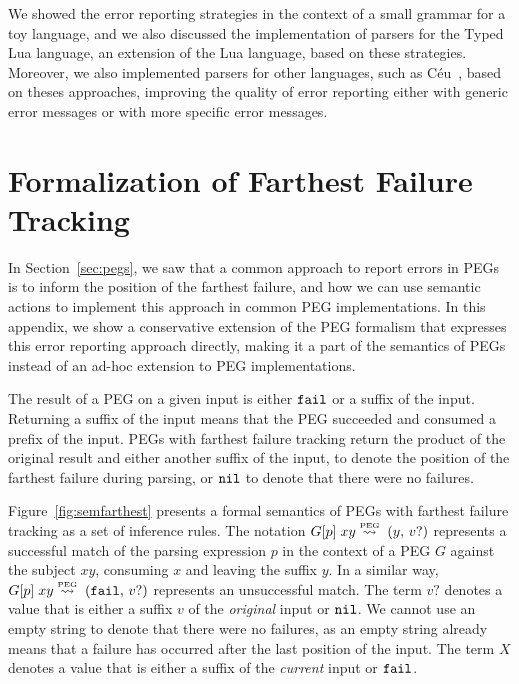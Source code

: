 \documentclass[3p,12pt,singlecolumn]{elsarticle}
\newcommand{\Lp}{\stackrel{\mbox{\tiny{PEG}}}{\leadsto}}
\newcommand{\Tup}[2]{(#1,\,#2)}
\newcommand{\Any}{X}
\newcommand{\Fail}{{\tt fail}}
\newcommand{\Nil}{{\tt nil}}
\begin{document}
We showed the error reporting strategies in the context
of a small grammar for a toy language, and we also discussed
the implementation of parsers for the Typed Lua language,
an extension of the Lua language, based on these strategies.
Moreover, we also implemented parsers for other languages,
such as Céu~\cite{ceu}, based on theses approaches,
improving the quality of error reporting either with
generic error messages or with more specific error messages.





\appendix
\clearpage{}\appendix
\section{Formalization of Farthest Failure Tracking}
\label{sec:semfarther}

In Section~\ref{sec:pegs}, we saw that a common approach
to report errors in PEGs is to inform the position of the
farthest failure,
and how we can use semantic actions to implement
this approach in common PEG implementations. In this appendix,
we show a conservative extension of the PEG formalism
that expresses this error reporting approach directly,
making it a part of the semantics of PEGs instead of an
ad-hoc extension to PEG implementations.

The result of a PEG on a given input is either
$\Fail$ or a suffix of the input. Returning a suffix of the
input means that the PEG succeeded and consumed a prefix
of the input. PEGs with farthest failure tracking return
the product of the original result and either another
suffix of the input, to denote the position of the farthest
failure during parsing, or $\Nil$ to denote that 
there were no failures. 

Figure~\ref{fig:semfarthest} presents a formal semantics of
PEGs with farthest failure tracking as a set of inference rules.
The notation $G[p] \; xy \Lp \; \Tup{y}{v?}$ represents
a successful match of the parsing expression $p$ in the context of
a PEG $G$ against the subject $xy$, consuming $x$ and leaving the
suffix $y$.
In a similar way, $G[p] \; xy \Lp \; \Tup{\Fail}{v?}$
represents an unsuccessful match. The term $v?$ denotes
a value that is either a suffix $v$ of the {\em original} input or
$\Nil$. We cannot use an empty string to denote that there were no failures,
as an empty string already means that a failure has occurred after
the last position of the input.
The term $\Any$ denotes a value that is either a suffix of the
{\em current} input or $\Fail$.
\end{document}
